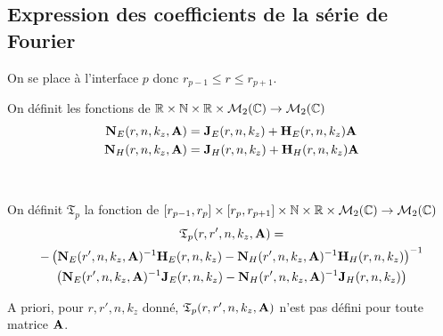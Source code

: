   \subsection{Expression des coefficients de la série de Fourier}

    On se place à l'interface \(p\) donc \(r_{p-1} \le r \le r_{p+1} \).

    \begin{defn}
      \label{def:cylindre:matrices_NE-NH}
      On définit les fonctions de \(\mathbb R\times \mathbb N \times \mathbb R \times \mathcal{M}_{2}(\mathbb C) \rightarrow \mathcal{M}_{2}(\mathbb C)\)
      \begin{align*}
        \mathbf{N}_{E}(r,n,k_z,\mathbf{A}) &= \mathbf{J}_{E}(r,n,k_z) + \mathbf{H}_{E}(r,n,k_z)\mathbf{A}
        \\
        \mathbf{N}_{H}(r,n,k_z,\mathbf{A}) &= \mathbf{J}_{H}(r,n,k_z) + \mathbf{H}_{H}(r,n,k_z)\mathbf{A}
      \end{align*}
    \end{defn}

    \begin{defn}%
      \label{def:cylindre:transfert:reflexion}{}~

      On définit \(\mathfrak{T}_p\) la fonction de \([r_{p-1}, r_p]\times[r_p, r_{p+1}]\times\mathbb N\times\mathbb R\times\mathcal{M}_2(\mathbb C)\rightarrow \mathcal{M}_{2}(\mathbb C)\)
      \begin{multline*}
        \mathfrak{T}_p(r,r',n,k_z,\mathbf{A}) = \\
          -\left(\mathbf{N}_{E}(r',n,k_z,\mathbf{A})^{-1}\mathbf{H}_{E}(r,n,k_z) - \mathbf{N}_{H}(r',n,k_z,\mathbf{A})^{-1}\mathbf{H}_{H}(r,n,k_z)\right)^{-1}
          \\
          \left(\mathbf{N}_{E}(r',n,k_z,\mathbf{A})^{-1}\mathbf{J}_{E}(r,n,k_z) - \mathbf{N}_{H}(r',n,k_z,\mathbf{A})^{-1}\mathbf{J}_{H}(r,n,k_z)\right)
      \end{multline*}
    \end{defn}
    A priori, pour \(r,r',n,k_z\) donné, \(\mathfrak{T}_p(r,r',n,k_z,\mathbf{A})\) n'est pas défini pour toute matrice \(\mathbf{A}\).

